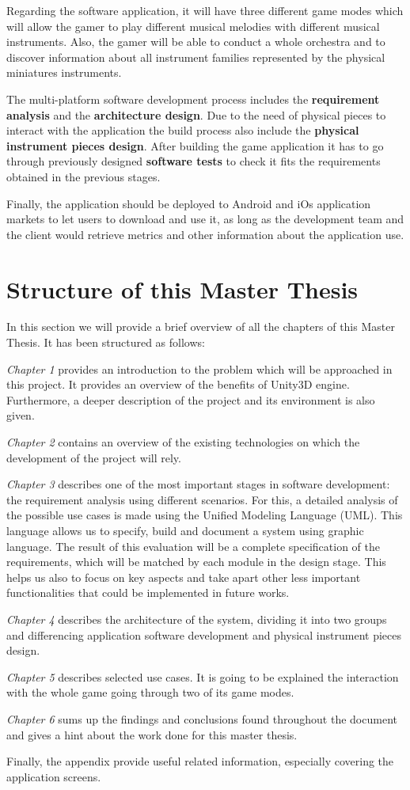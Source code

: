 Regarding the software application, it will have three different game modes which will allow the gamer to play different musical melodies with different musical instruments. Also, the gamer will be able to conduct a whole orchestra and to discover information about all instrument families represented by the physical miniatures instruments.

The multi-platform software development process includes the \textbf{requirement analysis} and the \textbf{architecture design}. Due to the need of physical pieces to interact with the application the build process also include the \textbf{physical instrument pieces design}. After building the game application it has to go through previously designed \textbf{software tests} to check it fits the requirements obtained in the previous stages.

Finally, the application should be deployed to Android and iOs application markets to let users to download and use it, as long as the development team and the client would retrieve metrics and other information about the application use.


\section{Structure of this Master Thesis}

In this section we will provide a brief overview of all the chapters of this Master Thesis. It
has been structured as follows:

\textit{Chapter 1} provides an introduction to the problem which will be approached in this project. It provides an overview of the benefits of Unity3D engine. Furthermore, a deeper description of the project and its environment is also given.

\textit{Chapter 2} contains an overview of the existing technologies on which the development of the project will rely.

\textit{Chapter 3} describes one of the most important stages in software development: the requirement analysis using different scenarios. For this, a detailed analysis of the possible use cases is made using the Unified Modeling Language (UML). This language allows us to specify, build and document a system using graphic language.
The result of this evaluation will be a complete specification of the requirements, which will be matched by each module in the design stage. This helps us also to focus on key aspects and take apart other less important functionalities that could be implemented in future works.

\textit{Chapter 4} describes the architecture of the system, dividing it into two groups and differencing application software development and physical instrument pieces design.

\textit{Chapter 5} describes selected use cases. It is going to be explained the interaction with the whole game going through two of its game modes.

\textit{Chapter 6} sums up the findings and conclusions found throughout the document and gives a hint about the work done for this master thesis.

Finally, the appendix provide useful related information, especially covering the application screens.
